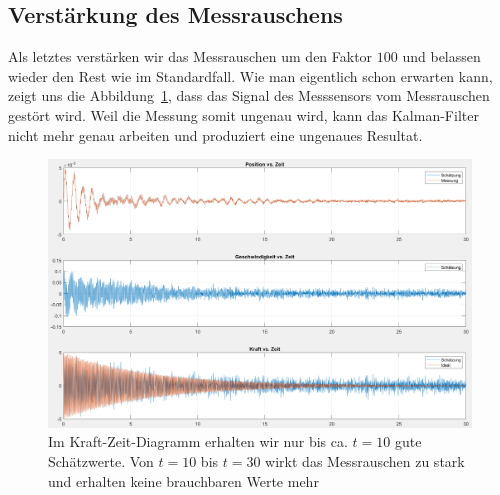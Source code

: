 \subsection{Verstärkung des Messrauschens}
Als letztes verstärken wir das Messrauschen um den Faktor $100$ und belassen wieder den Rest wie im Standardfall.
Wie man eigentlich schon erwarten kann, zeigt uns die Abbildung~\ref{erdbeben:fig:messrauschen-geaendert}, dass das Signal des Messsensors vom Messrauschen gestört wird.
Weil die Messung somit ungenau wird, kann das Kalman-Filter nicht mehr genau arbeiten und produziert eine ungenaues Resultat.

\begin{figure}
	\begin{center}
		\includegraphics[width=\linewidth,keepaspectratio]{papers/erdbeben/Messrauschen_geaendert.PNG}
		\caption{Im Kraft-Zeit-Diagramm erhalten wir nur bis ca. $t = 10$ gute Schätzwerte. Von $t = 10$ bis $t = 30$ wirkt das Messrauschen zu stark und erhalten keine brauchbaren Werte mehr}
	 \label{erdbeben:fig:messrauschen-geaendert}
	\end{center}
\end{figure}

